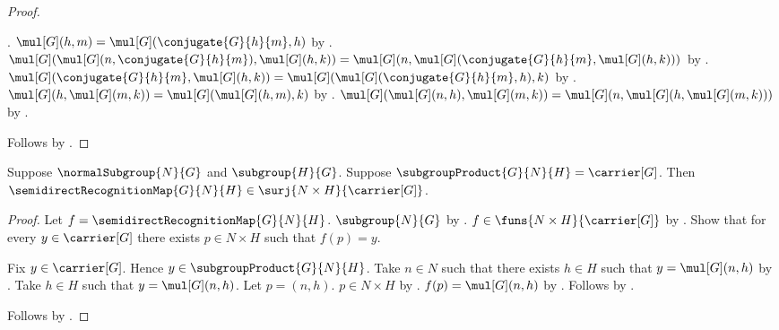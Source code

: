 \begin{proof}
\begin{subproof}
            .
        $\mul[G](h,m)=
            \mul[G](\conjugate{G}{h}{m},h)$ by
            .
        $\mul[G]
            (\mul[G](n,\conjugate{G}{h}{m}),\mul[G](h,k))=
            \mul[G]
                (n,\mul[G](\conjugate{G}{h}{m},\mul[G](h,k)))$ by
            .
        $\mul[G](\conjugate{G}{h}{m},\mul[G](h,k))=
            \mul[G](\mul[G](\conjugate{G}{h}{m},h),k)$ by
            .
        $\mul[G](h,\mul[G](m,k))=
            \mul[G](\mul[G](h,m),k)$ by
            .
        $\mul[G](\mul[G](n,h),\mul[G](m,k))=
            \mul[G](n,\mul[G](h,\mul[G](m,k)))$ by
            .
    \end{subproof}
    Follows by .
\end{proof}

\begin{theorem}\label{semidirect_recognition_map_surjective}
    Suppose $\normalSubgroup{N}{G}$ and $\subgroup{H}{G}$.
    Suppose $\subgroupProduct{G}{N}{H}=\carrier[G]$.
    Then $\semidirectRecognitionMap{G}{N}{H}\in
        \surj{N\times H}{\carrier[G]}$.
\end{theorem}
\begin{proof}
    Let $f=\semidirectRecognitionMap{G}{N}{H}$.
    $\subgroup{N}{G}$ by .
    $f\in\funs{N\times H}{\carrier[G]}$ by
        .
    Show that for every $y\in\carrier[G]$ there exists
        $p\in N\times H$ such that $f(p)=y$.
    \begin{subproof}
        Fix $y\in\carrier[G]$.
        Hence $y\in\subgroupProduct{G}{N}{H}$.
        Take $n\in N$ such that there exists $h\in H$ such that
            $y=\mul[G](n,h)$ by
            .
        Take $h\in H$ such that $y=\mul[G](n,h)$.
        Let $p=(n,h)$.
        $p\in N\times H$ by .
        $f(p)=\mul[G](n,h)$ by
            .
        Follows by \auto.
    \end{subproof}
    Follows by .
\end{proof}

